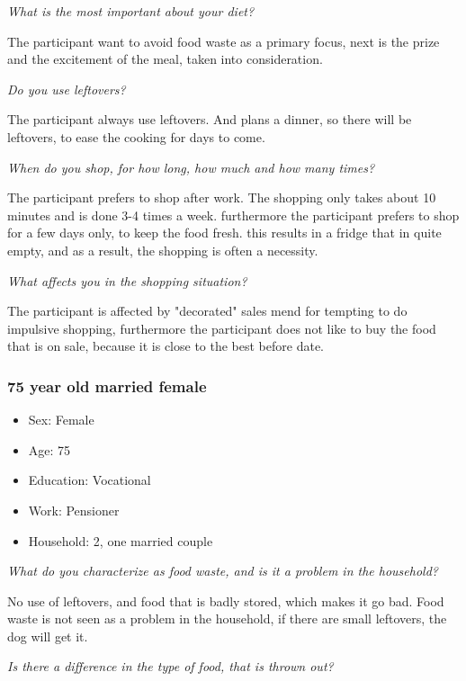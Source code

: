 \emph{What is the most important about your diet?}

The participant want to avoid food waste as a primary focus, next is the prize and the excitement of the meal, taken into consideration.

\emph{Do you use leftovers?}

The participant always use leftovers. And plans a dinner, so there will be leftovers, to ease the cooking for days to come.

\emph{When do you shop, for how long, how much and how many times?}

The participant prefers to shop after work. The shopping only takes about 10 minutes and is done 3-4 times a week. furthermore the participant prefers to shop for a few days only, to keep the food fresh. this results in a fridge that in quite empty, and as a result, the shopping is often a necessity.

\emph{What affects you in the shopping situation?}

The participant is affected by "decorated" sales mend for tempting to do impulsive shopping, furthermore the participant does not like to buy the food that is on sale, because it is close to the best before date.
\subsubsection{75 year old married female}
\begin{itemize}
  \item Sex: Female
  \item Age: 75
  \item Education: Vocational
  \item Work: Pensioner
  \item Household: 2, one married couple
\end{itemize}
\emph{What do you characterize as food waste, and is it a problem in the household?}

No use of leftovers, and food that is badly stored, which makes it go bad. Food waste is not seen as a problem in the household, if there are small leftovers, the dog will get it.

\emph{Is there a difference in the type of food, that is thrown out?}

